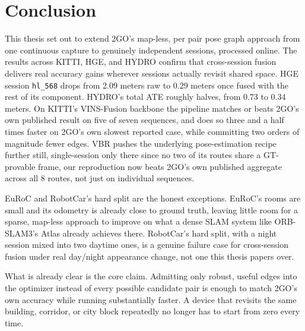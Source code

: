 %

\chapter{Conclusion}
\label{chap:conclusion}

This thesis set out to extend 2GO's map-less, per pair pose graph approach from one continuous
capture to genuinely independent sessions, processed online. The results across KITTI, HGE, and
HYDRO confirm that cross-session fusion delivers real accuracy gains wherever sessions actually
revisit shared space. HGE session \texttt{hl\_568} drops from 2.09 meters raw to 0.29 meters once
fused with the rest of its component. HYDRO's total ATE roughly halves, from 0.73 to 0.34 meters.
On KITTI's VINS-Fusion backbone the pipeline matches or beats 2GO's own published result on five
of seven sequences, and does so three and a half times faster on 2GO's own slowest reported case,
while committing two orders of magnitude fewer edges. VBR pushes the underlying pose-estimation
recipe further still, single-session only there since no two of its routes share a GT-provable
frame, our reproduction now beats 2GO's own published aggregate across all 8 routes, not just on
individual sequences.

EuRoC and RobotCar's hard split are the honest exceptions. EuRoC's rooms are small and its
odometry is already close to ground truth, leaving little room for a sparse, map-less approach to
improve on what a dense SLAM system like ORB-SLAM3's Atlas already achieves there. RobotCar's hard
split, with a night session mixed into two daytime ones, is a genuine failure case for
cross-session fusion under real day/night appearance change, not one this thesis papers over.

What is already clear is the core claim. Admitting only robust, useful edges into the optimizer
instead of every possible candidate pair is enough to match 2GO's own accuracy while running
substantially faster. A device that revisits the same building, corridor, or city block repeatedly
no longer has to start from zero every time.

